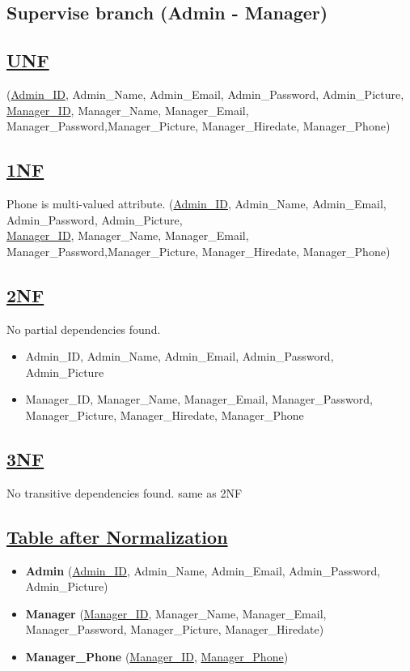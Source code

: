 \subsection{\texorpdfstring{\centering Supervise branch (Admin - Manager)}{Supervise branch (Admin - Manager)}}
\subsection*{\underline{UNF}}

(\underline{Admin\_ID}, Admin\_Name, Admin\_Email, Admin\_Password, Admin\_Picture,\\
\underline{Manager\_ID}, Manager\_Name, Manager\_Email, Manager\_Password,Manager\_Picture, Manager\_Hiredate, Manager\_Phone)

\subsection*{\underline{1NF}}
Phone is multi-valued attribute.
\vskip 0.2in
(\underline{Admin\_ID}, Admin\_Name, Admin\_Email, Admin\_Password, Admin\_Picture,\\
\underline{Manager\_ID}, Manager\_Name, Manager\_Email, Manager\_Password,Manager\_Picture, Manager\_Hiredate, Manager\_Phone)

\subsection*{\underline{2NF}}
No partial dependencies found.
\vskip 0.2in

\begin{itemize}
    \item Admin\_ID, Admin\_Name, Admin\_Email, Admin\_Password, Admin\_Picture
    \item Manager\_ID, Manager\_Name, Manager\_Email, Manager\_Password, Manager\_Picture, Manager\_Hiredate, Manager\_Phone
\end{itemize}

\subsection*{\underline{3NF}}
No transitive dependencies found.
\vskip 0.2in
same as 2NF

\subsection*{\underline{Table after Normalization}}
\vskip 0.2in
\begin{itemize}
    \item \textbf{Admin} (\underline{Admin\_ID}, Admin\_Name, Admin\_Email, Admin\_Password, Admin\_Picture)
    \item  \textbf{Manager} (\underline{Manager\_ID}, Manager\_Name, Manager\_Email, Manager\_Password, Manager\_Picture, Manager\_Hiredate)
    \item  \textbf{Manager\_Phone} (\underline{Manager\_ID}, \underline{Manager\_Phone})
\end{itemize}

